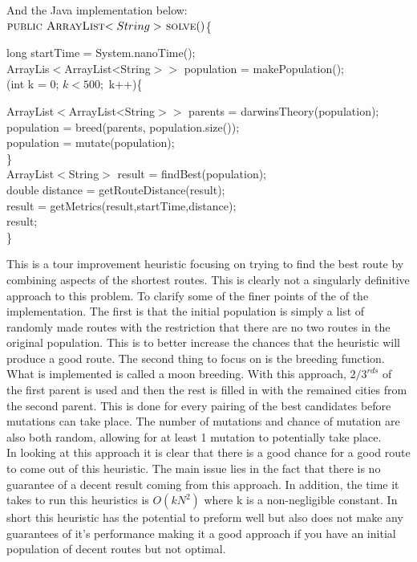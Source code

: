 \documentclass[midd]{thesis}
\newcommand{\tab}{\hspace*{2em}}
\begin{document}
And the Java implementation below:\\
$\textnormal{\scshape public ArrayList$<String>$ solve}()$\{
\begin{codebox}
long startTime = System.nanoTime();\\
\tab ArrayLis$<$ArrayList<String$>>$ population =  makePopulation();\\
\tab\For(int k = 0; $k < 500;$ k++)\{
\end{codebox}
\begin{codebox}
\tab\tab ArrayList$<$ArrayList<String$>>$ parents = darwinsTheory(population);\\
\tab\tab population = breed(parents, population.size());\\
\tab\tab population =  mutate(population);\End\\
\tab\}\\
\tab ArrayList$<$String$>$ result = findBest(population);\\
\tab double distance = getRouteDistance(result);\\
\tab result = getMetrics(result,startTime,distance);\\
\Return result;\\
\}
\end{codebox}
\tab This is a tour improvement heuristic focusing on trying to find the best route by combining aspects of the shortest routes. This is clearly not a singularly definitive approach to this problem. To clarify some of the finer points of the of the implementation. The first is that the initial population is simply a list of randomly made routes with the restriction that there are no two routes in the original population. This is to better increase the chances that the heuristic will produce a good route. The second thing to focus on is the breeding function. What is implemented is called a moon breeding. With this approach, $2/3^{rds}$ of the first parent is used and then the rest is filled in with the remained cities from the second parent. This is done for every pairing of the best candidates before mutations can take place. The number of mutations and chance of mutation are also both random, allowing for at least 1 mutation to potentially take place.\\
\tab In looking at this approach it is clear that there is a good chance for a good route to come out of this heuristic. The main issue lies in the fact that there is no guarantee of a decent result coming from this approach. In addition, the time it takes to run this heuristics is $O(kN^2)$ where k is a non-negligible constant. In short this heuristic has the potential to preform well but also does not make any guarantees of it's performance making it a good approach if you have an initial population of decent routes but not optimal.
\end{document}
